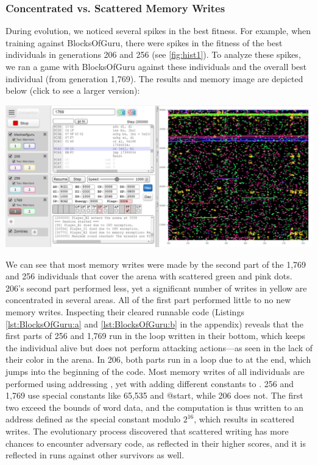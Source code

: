 \documentclass[dvipsnames, format=sigconf]{acmart}
\begin{document}
\subsubsection{Concentrated vs. Scattered Memory Writes}
\label{scattered}
During evolution, we noticed several spikes in the best fitness. For example, when training against BlocksOfGuru, there were spikes in the fitness of the best individuals in generations 206 and 256 (see \autoref{fig:hist1}). To analyze these spikes, we ran a game with BlocksOfGuru against these individuals and the overall best individual (from generation 1,769). The results and memory image are depicted below (click to see a larger version): 
\begin{center}
\href{https://bit.ly/codeguru_fig2}{\includegraphics[width=\linewidth]{images/blocksofguru_generations_comparison_memory.png}}
\end{center}


We can see that most memory writes were made by the second part of the 1,769 and 256 individuals that cover the arena with scattered green and pink dots. 206's second part performed less, yet a significant number of writes in yellow are concentrated in several areas. All of the first part performed little to no new memory writes. Inspecting their cleared runnable code (Listings \ref{lst:BlocksOfGuru:a} and \ref{lst:BlocksOfGuru:b} in the appendix) reveals that the first parts of 256 and 1,769 run in the loop written in their bottom, which keeps the individual alive but does not perform attacking actions---as seen in the lack of their color in the arena. In 206, both parts run in a loop due to  at the end, which jumps into the beginning of the code. Most memory writes of all individuals are performed using addressing , yet with adding different constants to . 256 and 1,769 use special constants like 65,535 and @start, while 206 does not. The first two exceed the bounds of word data, and the computation is thus written to an address defined as the special constant modulo $2^{16}$, which results in scattered writes. The evolutionary process discovered that scattered writing has more chances to encounter adversary code, as reflected in their higher scores, and it is reflected in runs against other survivors as well. 
\end{document}
